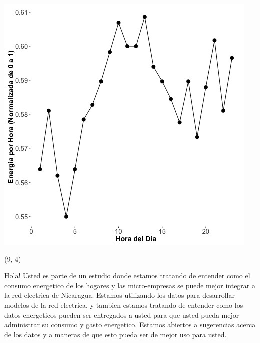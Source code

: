 \documentclass{article}\usepackage[]{graphicx}\usepackage[]{color}
\newenvironment{knitrout}{}{} %
\begin{document}
\begin{knitrout}
\color{fgcolor}
\includegraphics[scale=0.75]{figure/A20_fplot_norm_median} 
\end{knitrout}

 \begin{textblock}{1}(9,-4)
\begin{minipage}{20em}
\begingroup

\endgroup
\end{minipage}
\end{textblock}

\vspace{70px}
\begin{knitrout}
Hola! Usted es parte de un estudio donde estamos tratando de entender como el consumo energetico de los hogares y las micro-empresas se puede mejor integrar a la red electrica de Nicaragua. Estamos utilizando los datos para desarrollar modelos de la red electrica, y tambien estamos tratando de entender como los datos energeticos pueden ser entregados a usted para que usted pueda mejor administrar su consumo y gasto energetico.  Estamos abiertos a sugerencias acerca de los datos y a maneras de que esto pueda ser de mejor uso para usted.
\end{knitrout}
\end{document}
